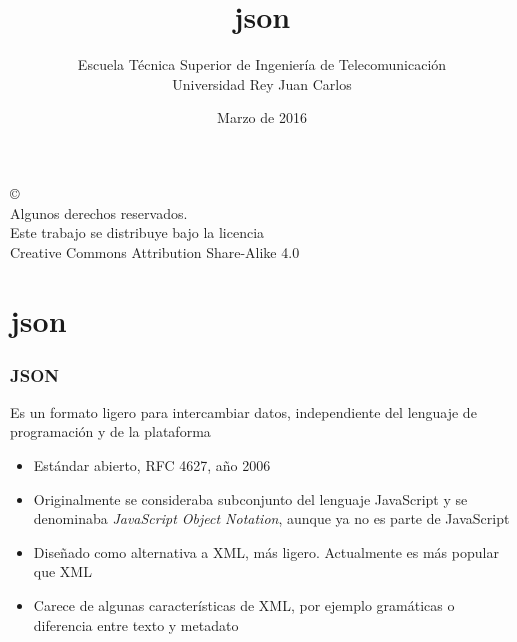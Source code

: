 \documentclass[ucs]{beamer}
\begin{document}
\title[json]{json }
\author[GSyC]{Escuela Técnica Superior de Ingeniería de Telecomunicación\\
Universidad Rey Juan Carlos}
\date[2016]{Marzo de 2016}


\begin{frame}
  \titlepage
\end{frame}



\begin{frame}[b]
\begin{flushright}
{\tiny
\copyright \insertshortdate~\insertshortauthor \\
  Algunos derechos reservados. \\
  Este trabajo se distribuye bajo la licencia \\
  Creative Commons Attribution Share-Alike 4.0\\
}
\end{flushright}  
\end{frame}









\section{json}


\begin{frame}[fragile]
\frametitle{JSON}
Es un formato ligero para intercambiar datos, independiente del lenguaje de 
programación y de la plataforma
\begin{itemize}
\item
Estándar abierto, RFC 4627, año 2006
\item
Originalmente se consideraba subconjunto del lenguaje JavaScript y se
denominaba  \emph{JavaScript Object Notation}, aunque ya no es parte de JavaScript
\item
Diseñado como alternativa a XML, más ligero. Actualmente es más popular que XML
\item
Carece de algunas características de XML, por ejemplo gramáticas o diferencia entre texto y metadato 
\end{itemize}

\end{frame}
\end{document}
